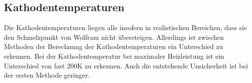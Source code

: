 \subsection{Kathodentemperaturen}

\noindent Die Kathodentemperaturen liegen alle insofern in realistischen Bereichen, dass sie den Schmelzpunkt von Wolfram nicht übersteigen. Allerdings ist zwischen Methoden der Berechnung der Kathodentemperaturen ein Unterschied zu erkennen. Bei der Kathodentemperatur bei maximaler Heizleistung ist ein Unterschied von fast 200K zu erkennen. Auch die entstehende Unsicherheit ist bei der ersten Methode geringer.

